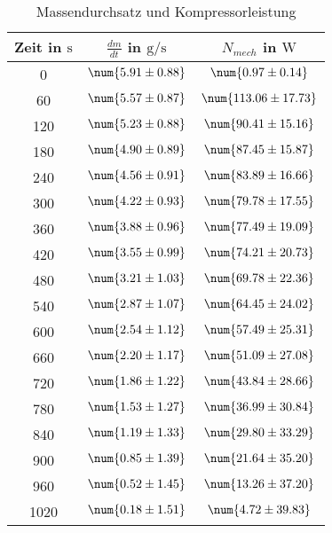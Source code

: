 \begin{table} 
 \centering 
 \begin{tabular}{S S S } 
 \toprule  
{Zeit in $\si{\second}$} & {$\frac{dm}{dt}$ in $\si{\gram \per \second}$} & {$N_{mech}$ in $\si{\watt}$}  \\ 
  & $\num{ 5.91 \pm 0.88 }$ & $\num{ 0.97 \pm 0.14 }$ \\ 
60  & $\num{ 5.57 \pm 0.87 }$ & $\num{ 113.06 \pm 17.73 }$ \\ 
120  & $\num{ 5.23 \pm 0.88 }$ & $\num{ 90.41 \pm 15.16 }$ \\ 
180  & $\num{ 4.90 \pm 0.89 }$ & $\num{ 87.45 \pm 15.87 }$ \\ 
240  & $\num{ 4.56 \pm 0.91 }$ & $\num{ 83.89 \pm 16.66 }$ \\ 
300  & $\num{ 4.22 \pm 0.93 }$ & $\num{ 79.78 \pm 17.55 }$ \\ 
360  & $\num{ 3.88 \pm 0.96 }$ & $\num{ 77.49 \pm 19.09 }$ \\ 
420  & $\num{ 3.55 \pm 0.99 }$ & $\num{ 74.21 \pm 20.73 }$ \\ 
480  & $\num{ 3.21 \pm 1.03 }$ & $\num{ 69.78 \pm 22.36 }$ \\ 
540  & $\num{ 2.87 \pm 1.07 }$ & $\num{ 64.45 \pm 24.02 }$ \\ 
600  & $\num{ 2.54 \pm 1.12 }$ & $\num{ 57.49 \pm 25.31 }$ \\ 
660  & $\num{ 2.20 \pm 1.17 }$ & $\num{ 51.09 \pm 27.08 }$ \\ 
720  & $\num{ 1.86 \pm 1.22 }$ & $\num{ 43.84 \pm 28.66 }$ \\ 
780  & $\num{ 1.53 \pm 1.27 }$ & $\num{ 36.99 \pm 30.84 }$ \\ 
840  & $\num{ 1.19 \pm 1.33 }$ & $\num{ 29.80 \pm 33.29 }$ \\ 
900  & $\num{ 0.85 \pm 1.39 }$ & $\num{ 21.64 \pm 35.20 }$ \\ 
960  & $\num{ 0.52 \pm 1.45 }$ & $\num{ 13.26 \pm 37.20 }$ \\ 
1020  & $\num{ 0.18 \pm 1.51 }$ & $\num{ 4.72 \pm 39.83 }$ \\ 
\bottomrule 
 \end{tabular} 
 \caption{Massendurchsatz und Kompressorleistung} 
 \label{tab: dmdtNmech} 
  \end{table}